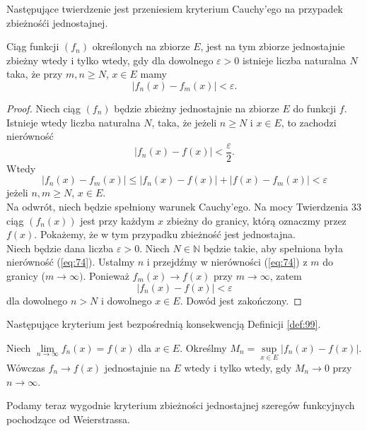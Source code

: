 \documentclass[leqno]{article}
\begin{document}
\begin{justify}
Następujące twierdzenie jest przeniesiem kryterium Cauchy'ego na przypadek zbieżnośći jednostajnej.

\begin{theorem}
{
    Ciąg funkcji $(f_n)$ określonych na zbiorze $E$, jest na tym zbiorze jednostajnie zbieżny wtedy i tylko wtedy, gdy
    dla dowolnego $\varepsilon > 0$ istnieje liczba naturalna $N$ taka, że przy $m, n \geqslant N$, $x \in E$ mamy
    \begin{equation}\label{eq:74}
        |f_n(x) - f_m(x)| < \varepsilon.
    \end{equation}
}
\end{theorem}

\begin{proof}
    Niech ciąg $(f_n)$ będzie zbieżny jednostajnie na zbiorze $E$ do funkcji $f$. Istnieje wtedy liczba
    naturalna $N$, taka, że jeżeli $n \geqslant N$ i $x \in E$, to zachodzi nierówność
    \[
        |f_n(x) - f(x)| < \frac{\varepsilon}{2}.
    \]
    Wtedy
    \[
        |f_n(x) - f_m(x)| \leqslant |f_n(x) - f(x)| + |f(x) - f_m(x)| < \varepsilon
    \]
    jeżeli $n,m \geqslant N$, $x \in E$. \\
    Na odwrót, niech będzie spełniony warunek Cauchy'ego. Na mocy Twierdzenia 33 ciąg $(f_n(x))$ jest przy
    każdym $x$ zbieżny do granicy, którą oznaczmy przez $f(x)$. Pokażemy, że w tym przypadku zbieżność jest jednostajna. \\
    Niech będzie dana liczba $\varepsilon > 0$. Niech $N \in \mathbb{N}$ będzie takie, aby spełniona
    była nierówność (\ref{eq:74}). Ustalmy $n$ i przejdźmy w nierówności (\ref{eq:74}) z $m$ do granicy ($m \to \infty)$.
    Ponieważ $f_m(x) \to f(x)$ przy $m \to \infty$, zatem
    \[
        |f_n(x) - f(x)| < \varepsilon
    \]
    dla dowolnego $n > N$ i dowolnego $x \in E$. Dowód jest zakończony.
\end{proof}

Następujące kryterium jest bezpośrednią konsekwencją Definicji \ref{def:99}.

\begin{theorem}
{
    Niech $\lim\limits_{n \to \infty}f_n(x) = f(x)$ dla $x \in E$. Określmy $M_n = \sup\limits_{x \in E}|f_n(x) - f(x)|$.
    Wówczas $f_n \to f(x)$ jednostajnie na $E$ wtedy i tylko wtedy, gdy $M_n \to 0$ przy $n \to \infty$.
}
\end{theorem}

Podamy teraz wygodnie kryterium zbieżności jednostajnej szeregów funkcyjnych pochodzące od Weierstrassa.


\end{justify}
\end{document}
